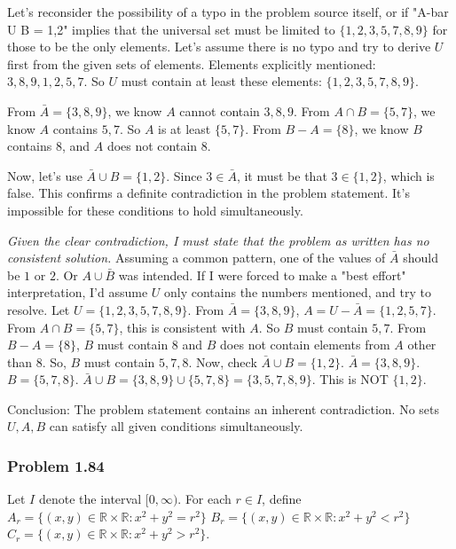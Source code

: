 \documentclass{article}
\begin{document}
Let's reconsider the possibility of a typo in the problem source itself, or if "A-bar U B = {1,2}" implies that the universal set must be limited to $\{1,2,3,5,7,8,9\}$ for those to be the only elements.
Let's assume there is no typo and try to derive $U$ first from the given sets of elements.
Elements explicitly mentioned: $3, 8, 9, 1, 2, 5, 7$.
So $U$ must contain at least these elements: $\{1, 2, 3, 5, 7, 8, 9\}$.

From $\bar{A} = \{3, 8, 9\}$, we know $A$ cannot contain $3, 8, 9$.
From $A \cap B = \{5, 7\}$, we know $A$ contains $5, 7$. So $A$ is at least $\{5, 7\}$.
From $B - A = \{8\}$, we know $B$ contains $8$, and $A$ does not contain $8$.

Now, let's use $\bar{A} \cup B = \{1, 2\}$.
Since $3 \in \bar{A}$, it must be that $3 \in \{1, 2\}$, which is false.
This confirms a definite contradiction in the problem statement. It's impossible for these conditions to hold simultaneously.

\textit{Given the clear contradiction, I must state that the problem as written has no consistent solution.}
Assuming a common pattern, one of the values of $\bar{A}$ should be $1$ or $2$. Or $A \cup \bar{B}$ was intended.
If I were forced to make a "best effort" interpretation, I'd assume $U$ only contains the numbers mentioned, and try to resolve.
Let $U = \{1, 2, 3, 5, 7, 8, 9\}$.
From $\bar{A} = \{3, 8, 9\}$, $A = U - \bar{A} = \{1, 2, 5, 7\}$.
From $A \cap B = \{5, 7\}$, this is consistent with $A$. So $B$ must contain $5, 7$.
From $B - A = \{8\}$, $B$ must contain $8$ and $B$ does not contain elements from $A$ other than $8$.
So, $B$ must contain $5, 7, 8$.
Now, check $\bar{A} \cup B = \{1, 2\}$.
$\bar{A} = \{3, 8, 9\}$.
$B = \{5, 7, 8\}$.
$\bar{A} \cup B = \{3, 8, 9\} \cup \{5, 7, 8\} = \{3, 5, 7, 8, 9\}$.
This is NOT $\{1, 2\}$.

Conclusion: The problem statement contains an inherent contradiction. No sets $U, A, B$ can satisfy all given conditions simultaneously.

\subsubsection*{Problem 1.84}
Let $I$ denote the interval $[0, \infty)$. For each $r \in I$, define
$A_r = \{(x, y) \in \mathbb{R} \times \mathbb{R} : x^2 + y^2 = r^2\}$
$B_r = \{(x, y) \in \mathbb{R} \times \mathbb{R} : x^2 + y^2 < r^2\}$
$C_r = \{(x, y) \in \mathbb{R} \times \mathbb{R} : x^2 + y^2 > r^2\}$.
\end{document}

